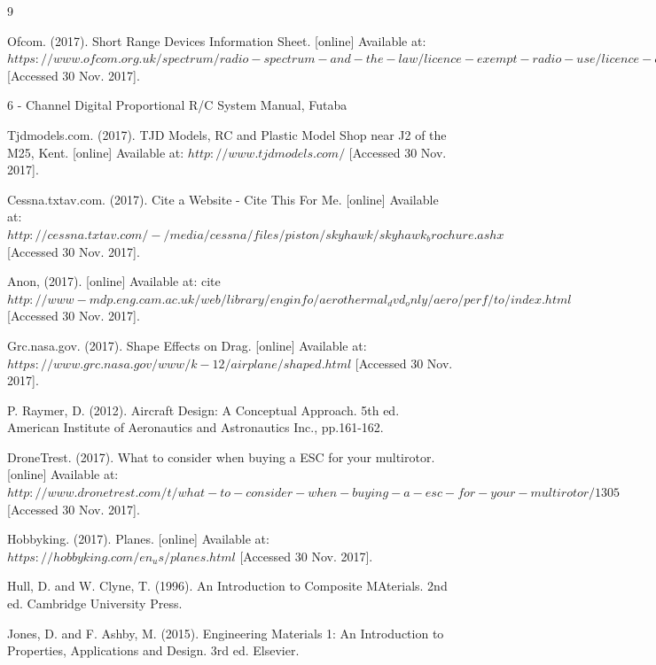 \documentclass[12pt]{article}
\begin{document}
\begin{thebibliography}{9}
    
Ofcom. (2017). Short Range Devices Information Sheet. [online] Available at: $https://www.ofcom.org.uk/spectrum/radio-spectrum-and-the-law/licence-exempt-radio-use/licence-exempt-devices/short-range-devices-information$ [Accessed 30 Nov. 2017].

6 - Channel Digital Proportional R/C System Manual, Futaba

Tjdmodels.com. (2017). TJD Models, RC and Plastic Model Shop near J2 of the M25, Kent. [online] Available at: $http://www.tjdmodels.com/$ [Accessed 30 Nov. 2017].

Cessna.txtav.com. (2017). Cite a Website - Cite This For Me. [online] Available at: $http://cessna.txtav.com/-/media/cessna/files/piston/skyhawk/skyhawk_brochure.ashx$ [Accessed 30 Nov. 2017].

Anon, (2017). [online] Available at: cite $http://www-mdp.eng.cam.ac.uk/web/library/enginfo/aerothermal_dvd_only/aero/perf/to/index.html$ [Accessed 30 Nov. 2017].

Grc.nasa.gov. (2017). Shape Effects on Drag. [online] Available at: $https://www.grc.nasa.gov/www/k-12/airplane/shaped.html$ [Accessed 30 Nov. 2017].

P. Raymer, D. (2012). Aircraft Design: A Conceptual Approach. 5th ed. American Institute of Aeronautics and Astronautics Inc., pp.161-162.

DroneTrest. (2017). What to consider when buying a ESC for your multirotor. [online] Available at: $http://www.dronetrest.com/t/what-to-consider-when-buying-a-esc-for-your-multirotor/1305$ [Accessed 30 Nov. 2017].


Hobbyking. (2017). Planes. [online] Available at: $https://hobbyking.com/en_us/planes.html$ [Accessed 30 Nov. 2017].

Hull, D. and W. Clyne, T. (1996). An Introduction to Composite MAterials. 2nd ed. Cambridge University Press.

Jones, D. and F. Ashby, M. (2015). Engineering Materials 1: An Introduction to Properties, Applications and Design. 3rd ed. Elsevier.


\end{thebibliography}
\end{document}

